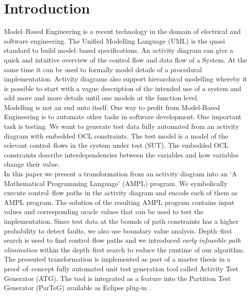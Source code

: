 \documentclass[runningheads,a4paper]{llncs}%
\begin{document}
\section{Introduction}%
Model--Based Engineering is a recent technology in the domain of electrical and software engineering. The Unified Modelling Language\textsuperscript{\texttrademark} (UML) is the quasi standard to build model--based specifications. 
An activity diagram can give a quick and intuitive overview of the control flow and data flow of a System. At the same time it can be used to formally model details of a procedural implementation. Activity diagrams also support hierarchical modelling whereby it is possible to start with a vague description of the intended use of a system and add more and more details until one models at the function level.\\
Modelling is not an end unto itself. One way to profit from Model-Based Engineering is to automate other tasks in software development. One important task is testing. We want to generate test data fully automated from an activity diagram with embedded OCL constraints. The test model is a model of the relevant control--flows in the system under test (SUT). The embedded OCL constraints describe interdependencies between the variables and how variables change their value.\\
In this paper we present a transformation from an activity diagram into an `A Mathematical Programming Language' (AMPL) program. We symbolically execute control--flow paths in the activity diagram and encode each of them as AMPL program. The solution of the resulting AMPL program contains input values and corresponding oracle values that can be used to test the implementation. Since test data at the bounds of path constraints has a higher probability to detect faults, we also use boundary value analysis. Depth--first search is used to find control--flow paths and we introduced \emph{early infeasible path elimination} within the depth--first search to reduce the runtime of our algorithm. The presented transformation is implemented as part of a master thesis \cite{Kurth2014AutomatedGen} in a proof--of--concept fully automated unit test generation tool called Activity Test Generator (ATG). The tool is integrated as a feature into the Partition Test Generator (ParTeG) available as Eclipse plug-in \cite{PartegWebsite}.\\%
\end{document}
